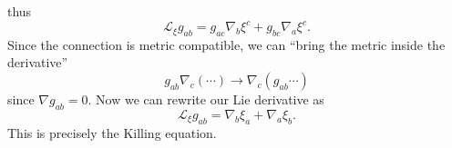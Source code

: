 thus
\begin{equation}%
\mathscr{L}_{\xi}g_{ab} = g_{ac}\nabla_{b}\xi^{c} + g_{bc}\nabla_{a}\xi^{c}.
\end{equation}
Since the connection is metric compatible, we can ``bring the
metric inside the derivative''
\begin{equation*}%
g_{ab}\nabla_{c}(\cdots) \to \nabla_{c}(g_{ab}\cdots)
\end{equation*}
since $\nabla g_{ab} = 0$. Now we can rewrite our Lie derivative
as
\begin{equation}%
\mathscr{L}_{\xi}g_{ab} = \nabla_{b}\xi_{a} + \nabla_{a}\xi_{b}.
\end{equation}
This is precisely the Killing equation.
